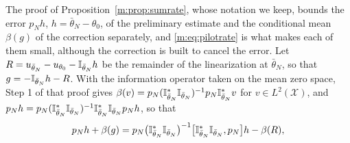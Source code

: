\begin{remark}\label{m:rem:sumopen}
The proof of Proposition~\ref{m:prop:sumrate}, whose notation we keep, bounds the error $p_Nh$, $h=\bar\theta_N-\theta_0$, of the preliminary estimate and the conditional mean $\beta(g)$ of the correction separately, and \eqref{m:eq:pilotrate} is what makes each of them small, although the correction is built to cancel the error. Let $R=u_{\bar\theta_N}-u_{\theta_0}-\mathbb{I}_{\bar\theta_N}h$ be the remainder of the linearization at $\bar\theta_N$, so that $g=-\mathbb{I}_{\bar\theta_N}h-R$. With the information operator taken on the mean zero space, Step 1 of that proof gives $\beta(v)=p_N(\mathbb{I}^*_{\bar\theta_N}\mathbb{I}_{\bar\theta_N})^{-1}p_N\mathbb{I}^*_{\bar\theta_N}v$ for $v\in L^2(\mathcal X)$, and $p_Nh=p_N(\mathbb{I}^*_{\bar\theta_N}\mathbb{I}_{\bar\theta_N})^{-1}\mathbb{I}^*_{\bar\theta_N}\mathbb{I}_{\bar\theta_N}p_Nh$, so that
\[
p_Nh+\beta(g)=p_N\big(\mathbb{I}^*_{\bar\theta_N}\mathbb{I}_{\bar\theta_N}\big)^{-1}\big[\mathbb{I}^*_{\bar\theta_N}\mathbb{I}_{\bar\theta_N},p_N\big]h-\beta(R),
\]

\end{remark}
